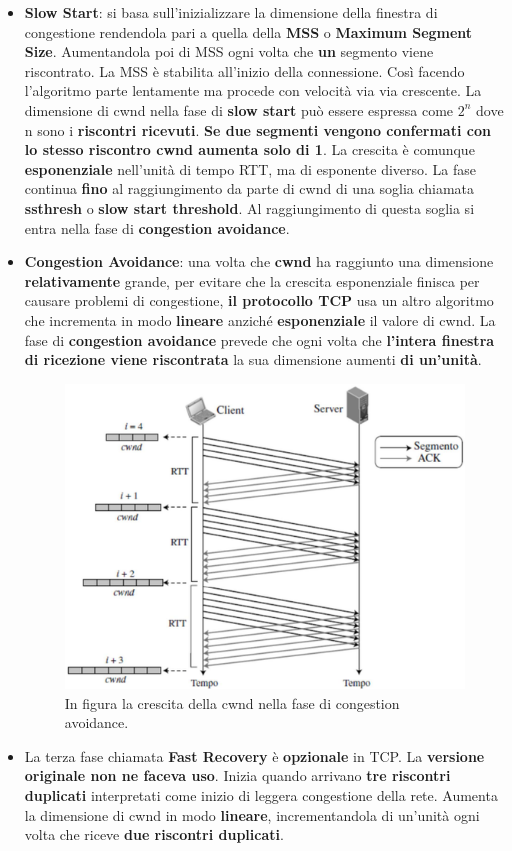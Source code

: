 \documentclass[11pt,a4paper]{article}
\theoremstyle{definition}
\begin{document}
\begin{itemize}
	\item \textbf{Slow Start}: si basa sull'inizializzare la dimensione della finestra di congestione rendendola pari a quella della \textbf{MSS} o \textbf{Maximum Segment Size}. Aumentandola poi di MSS ogni volta che \textbf{un} segmento viene riscontrato. La MSS è stabilita all'inizio della connessione. Così facendo l'algoritmo parte lentamente ma procede con velocità via via crescente. La dimensione di cwnd nella fase di \textbf{slow start} può essere espressa come $2^{n}$ dove n sono i \textbf{riscontri ricevuti}.\textbf{ Se due segmenti vengono confermati con lo stesso riscontro cwnd aumenta solo di 1}. La crescita è comunque \textbf{esponenziale} nell'unità di tempo RTT, ma di esponente diverso. La fase continua \textbf{fino} al raggiungimento da parte di cwnd di una soglia chiamata \textbf{ssthresh} o \textbf{slow start threshold}. Al raggiungimento di questa soglia si entra nella fase di \textbf{congestion avoidance}.
	\item \textbf{Congestion Avoidance}: una volta che \textbf{cwnd} ha raggiunto una dimensione \textbf{relativamente} grande, per evitare che la crescita esponenziale finisca per causare problemi di congestione, \textbf{il protocollo TCP} usa un altro algoritmo che incrementa in modo \textbf{lineare} anziché \textbf{esponenziale} il valore di cwnd. La fase di \textbf{congestion avoidance} prevede che ogni volta che \textbf{l'intera finestra di ricezione viene riscontrata} la sua dimensione aumenti \textbf{di un'unità}.
	      \begin{figure}[!h]
		      \includegraphics[scale=0.38]{Immagini/CA_tcp.png}
		      \centering
		      \caption{In figura la crescita della cwnd nella fase di congestion avoidance.}
	      \end{figure}\newline
	\item La terza fase chiamata \textbf{Fast Recovery} è \textbf{opzionale} in TCP. La \textbf{versione originale non ne faceva uso}. Inizia quando arrivano \textbf{tre riscontri duplicati} interpretati come inizio di leggera congestione della rete. Aumenta la dimensione di cwnd in modo \textbf{lineare}, incrementandola di un'unità ogni volta che riceve \textbf{due riscontri duplicati}.
\end{itemize}
\end{document}
